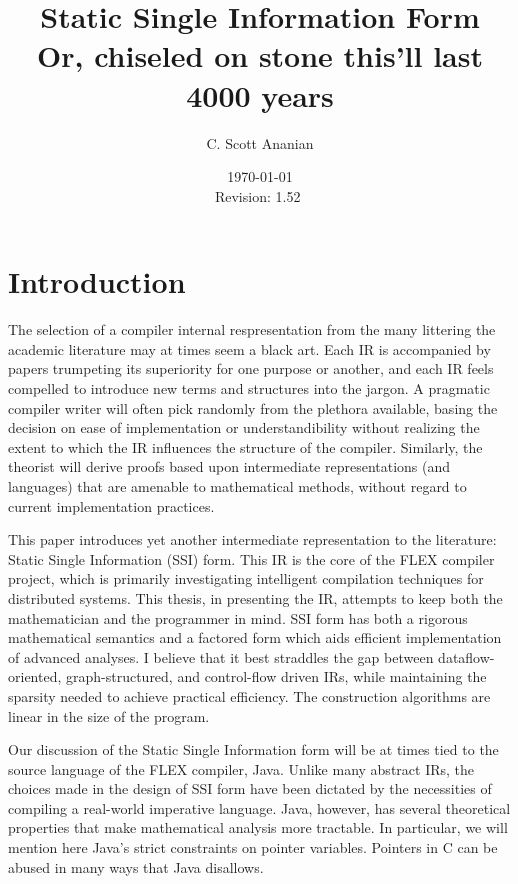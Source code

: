\documentclass[12pt,titlepage]{article}
\title{Static Single Information Form\\
\small Or, chiseled on stone this'll last 4000 years}
\author{C. Scott Ananian}
\date{\today \\ $ $Revision: 1.52 $ $}
\newcommand{\mysection}[1]{\section{#1}\setcounter{figure}{0}}
\begin{document}
\pagestyle{myheadings}


\maketitle
\tableofcontents\listoffigures\listofalgorithms\newpage

\mysection{Introduction}
The selection of a compiler internal respresentation from the many
littering the academic literature may at times seem a black art.  Each
IR is accompanied by papers trumpeting its superiority for one purpose
or another, and each IR feels compelled to introduce new terms and
structures into the jargon.  A pragmatic compiler writer will often
pick randomly from the plethora available, basing the decision on ease
of implementation or understandibility without realizing the extent to
which the IR influences the structure of the compiler.  Similarly, the
theorist will derive proofs based upon intermediate representations
(and languages) that are amenable to mathematical methods, without
regard to current implementation practices.%

This paper introduces yet another intermediate
representation to the literature:  Static Single Information (SSI) form.
This IR is the core of the FLEX compiler project, which is primarily
investigating intelligent compilation techniques for distributed
systems.  This thesis, in presenting the IR,
attempts to keep both the mathematician and the programmer in mind.  
SSI form has both a rigorous mathematical semantics and a factored
form which aids efficient implementation of advanced analyses.
I believe that it best straddles the gap between dataflow-oriented,
graph-structured, and control-flow driven IRs, while maintaining the
sparsity needed to achieve practical efficiency.  The construction
algorithms are linear in the size of the program.

Our discussion of the Static Single Information form will be at times
tied to the source language of the FLEX compiler, Java.  Unlike many
abstract IRs, the choices made in the design of SSI form have been
dictated by the necessities of compiling a real-world imperative
language.  Java, however, has several theoretical properties that make
mathematical analysis more tractable.  In particular, we
will mention here Java's strict constraints on pointer variables.
Pointers in C can be abused in many ways that Java disallows.
\end{document}
